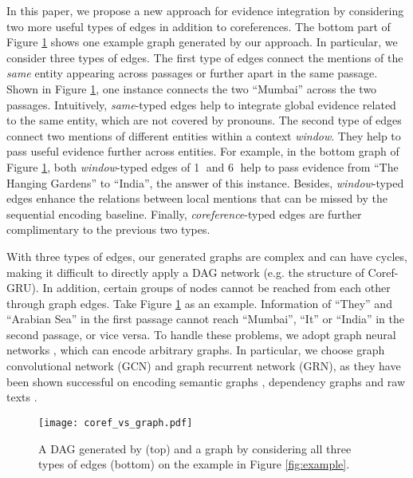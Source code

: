 \documentclass[letterpaper]{article}
\begin{document}
In this paper, we propose a new approach for evidence integration by considering two more useful types of edges in addition to coreferences.
The bottom part of Figure \ref{fig:coref_vs_graph} shows one example graph generated by our approach.
In particular, we consider three types of edges.
The first type of edges connect the mentions of the \emph{same} entity appearing across passages or further apart in the same passage.
Shown in Figure \ref{fig:coref_vs_graph}, one instance connects the two ``Mumbai'' across the two passages.
Intuitively, \emph{same}-typed edges help to integrate global evidence related to the same entity, which are not covered by pronouns.
The second type of edges connect two mentions of different entities within a context \emph{window}.
They help to pass useful evidence further across entities.
For example, in the bottom graph of Figure \ref{fig:coref_vs_graph}, both \emph{window}-typed edges of \textcircled{1} and \textcircled{6} help to pass evidence from ``The Hanging Gardens'' to ``India'', the answer of this instance.
Besides, \emph{window}-typed edges enhance the relations between local mentions that can be missed by the sequential encoding baseline.
Finally, \emph{coreference}-typed edges are further complimentary to the previous two types.


With three types of edges, our generated graphs are complex and can have cycles, making it difficult to directly apply a DAG network (e.g. the structure of Coref-GRU).
In addition, certain groups of nodes cannot be reached from each other through graph edges.
Take Figure \ref{fig:coref_vs_graph} as an example. 
Information of ``They'' and ``Arabian Sea'' in the first passage cannot reach ``Mumbai'', ``It'' or ``India'' in the second passage, or vice versa.
To handle these problems, we adopt graph neural networks \citep{scarselli2009graph}, which can encode arbitrary graphs.
In particular, we choose graph convolutional network (GCN) and graph recurrent network (GRN), as they have been shown successful on encoding semantic graphs \citep{P18-1150}, dependency graphs \citep{bastings-EtAl:2017:EMNLP2017,marcheggiani-titov:2017:EMNLP2017,song2018nary} and raw texts \citep{P18-1030}.


\begin{figure}
\centering
\texttt{[image: coref\_vs\_graph.pdf]}
\vspace{-0.5em}
\caption{A DAG generated by \citet{N18-2007} (top) and a graph by considering all three types of edges (bottom) on the example in Figure \ref{fig:example}.}
\label{fig:coref_vs_graph}
\vspace{-1.0em}
\end{figure}
\end{document}
